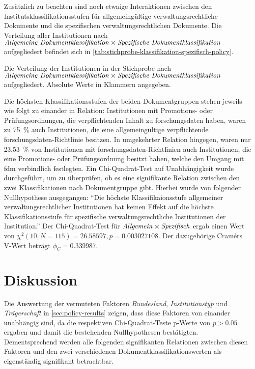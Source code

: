 Zusätzlich zu beachten sind noch etwaige Interaktionen zwischen den Institutsklassifikationsstufen für allgemeingültige verwaltungsrechtliche Dokumente und die spezifischen verwaltungsrechtlichen Dokumente.
Die Verteilung aller Institutionen nach $\text{\textit{Allgemeine Dokumentklassifikation}}\times\text{\textit{Spezifische Dokumentklassifikation}}$ aufgegliedert befindet sich in \cref{tab:stichprobe-klassifikation-spezifisch-policy}.
\begin{table}[!htbp]
	\caption{Die Verteilung der Institutionen in der Stichprobe nach $\text{\textit{Allgemeine Dokumentklassifikation}}\times\text{\textit{Spezifische Dokumentklassifikation}}$ aufgegliedert. Absolute Werte in Klammern angegeben.}
    
	\label{tab:stichprobe-klassifikation-spezifisch-policy}
\end{table}
Die höchsten Klassifikationsstufen der beiden Dokumentgruppen stehen jeweils wie folgt zu einander in Relation:
Institutionen mit Promotions- oder Prüfungsordnungen, die verpflichtenden Inhalt zu \gls{forschungsdaten} haben, waren zu \SI{75}{\percent} auch Institutionen, die eine allgemeingültige verpflichtende \gls{forschungsdaten}-Richtlinie besitzen.
In umgekehrter Relation hingegen, waren nur \SI{23,53}{\percent} von Institutionen mit \gls{forschungsdaten}-Richtlinien auch Institutionen, die eine Promotions- oder Prüfungsordnung besitzt haben, welche den Umgang mit \gls{fdm} verbindlich festlegten.
Ein Chi-Quadrat-Test auf Unabhängigkeit wurde durchgeführt, um zu überprüfen, ob es eine signifikante Relation zwischen den zwei Klassifikationen nach Dokumentgruppe gibt.
Hierbei wurde von folgender Nullhypothese ausgegangen:
\enquote{Die höchste Klassifikaionsstufe allgemeiner verwaltungsrechtlicher Institutionen hat keinen Effekt auf die höchste Klassifikationsstufe für spezifische verwaltungsrechtliche Institutionen der Institution.}
Der Chi-Quadrat-Test für $\text{\textit{Allgemein}}\times\text{\textit{Spezifisch}}$ ergab einen Wert von $\chi^2 (\num{10}, N = \num{115}) = \num[round-mode=places,round-precision=3]{26,58597}, p = \num[round-mode=places,round-precision=3]{0,003027108}$.
Der dazugehörige Cramérs V-Wert beträgt $\phi_C=\num[round-mode=places,round-precision=3]{0.339987}$.


\section{Diskussion}\label{sec:policy-discussion}
Die Auswertung der vermuteten Faktoren \textit{Bundesland}, \textit{Institutionstyp} und \textit{Trägerschaft} in \cref{sec:policy-results} zeigen, dass diese Faktoren von einander unabhängig sind, da die respektiven Chi-Quadrat-Teste p-Werte von $p>\num{0,05}$ ergaben und damit die bestehenden Nullhypothesen bestätigten.
Dementsprechend werden alle folgenden signifikanten Relationen zwischen diesen Faktoren und den zwei verschiedenen Dokumentklassifikationswerten als eigenständig signifikant betrachtbar.

